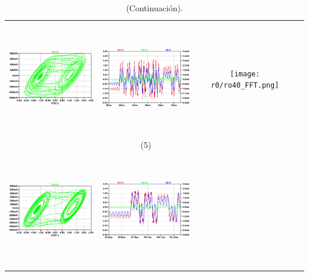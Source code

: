 \documentclass{rbf}
\begin{document}
\begin{table}[h]
    \centering
    \caption{\label{tab:CCC modificado variando r0} (Continuación).}\\
    \begin{tabular}{c c c c}
        \hline    
        \includegraphics[width=5cm,height=5cm]{r0/ro40_transicion_cap.png}&
        \includegraphics[width=5cm,height=5cm]{r0/ro40TS.1_transicion_cap.otra.png}&
        \texttt{[image: r0/ro40\_FFT.png]}&\\
        & (5) & \\   
        \includegraphics[width=5cm,height=5cm]{r0/ro50_CAP.png}&
        \includegraphics[width=5cm,height=5cm]{r0/ro50.TS_CAP.png}&

\end{tabular}
\end{table}
\end{document}
